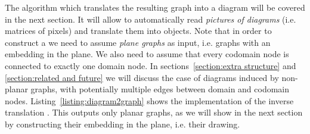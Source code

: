 The  algorithm which translates the resulting graph into a diagram will be covered in the next section.
It will allow to automatically read \emph{pictures of diagrams} (i.e. matrices of pixels) and translate them into  objects.
Note that in order to construct a  we need to assume \emph{plane graphs} as input, i.e. graphs with an embedding in the plane.
We also need to assume that every codomain node is connected to exactly one domain node.
In sections~\ref{section:extra structure} and \ref{section:related and future} we will discuss the case of diagrams induced by non-planar graphs, with potentially multiple edges between domain and codomain nodes.
Listing~\ref{listing:diagram2graph} shows the implementation of the inverse translation .
This outputs only planar graphs, as we will show in the next section by constructing their embedding in the plane, i.e. their drawing.
